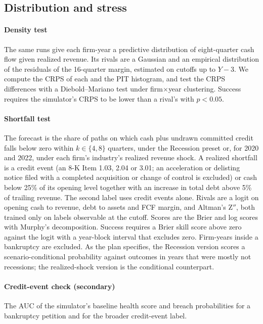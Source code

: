 \documentclass[preprint,12pt,authoryear]{elsarticle}
\begin{document}
\subsection{Distribution and stress}
\paragraph{Density test} The same runs give each firm-year a predictive distribution of eight-quarter cash flow given realized revenue. Its rivals are a Gaussian and an empirical distribution of the residuals of the 16-quarter margin, estimated on cutoffs up to $Y-3$. We compute the CRPS of each and the PIT histogram, and test the CRPS differences with a Diebold--Mariano test under firm$\times$year clustering. Success requires the simulator's CRPS to be lower than a rival's with $p<0.05$.

\paragraph{Shortfall test} The forecast is the share of paths on which cash plus undrawn committed credit falls below zero within $k\in\{4,8\}$ quarters, under the Recession preset or, for 2020 and 2022, under each firm's industry's realized revenue shock. A realized shortfall is a credit event (an 8-K Item 1.03, 2.04 or 3.01; an acceleration or delisting notice filed with a completed acquisition or change of control is excluded) or cash below 25\% of its opening level together with an increase in total debt above 5\% of trailing revenue. The second label uses credit events alone. Rivals are a logit on opening cash to revenue, debt to assets and FCF margin, and Altman's Z$''$, both trained only on labels observable at the cutoff. Scores are the Brier and log scores with Murphy's decomposition. Success requires a Brier skill score above zero against the logit with a year-block interval that excludes zero. Firm-years inside a bankruptcy are excluded. As the plan specifies, the Recession version scores a scenario-conditional probability against outcomes in years that were mostly not recessions; the realized-shock version is the conditional counterpart.

\paragraph{Credit-event check (secondary)} The AUC of the simulator's baseline health score and breach probabilities for a bankruptcy petition and for the broader credit-event label.
\end{document}
